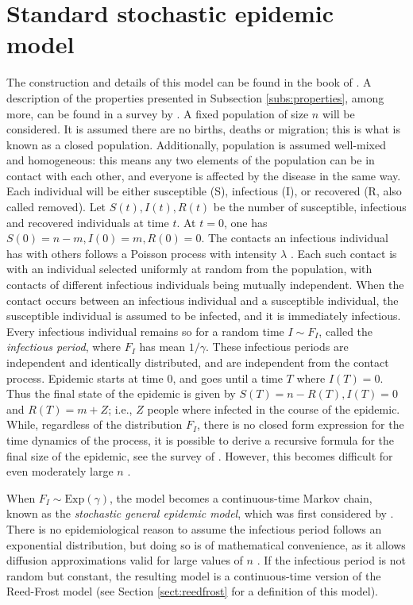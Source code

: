 \documentclass[aap]{imsart}
\theoremstyle{remark}
\begin{document}
\section{Standard stochastic epidemic model}\label{sect:standard_model}
The construction and details of this model can be found in the book of \citet{Andersson_Britton_2000}. A description of the properties presented in Subsection \ref{subs:properties}, among more, can be found in a survey by \citet{Britton_2010}. A fixed population of size $n$ will be considered. It is assumed there are no births, deaths or migration; this is what is known as a closed population. Additionally, population is assumed well-mixed and homogeneous: this means any two elements of the population can be in contact with each other, and everyone is affected by the disease in the same way. Each individual will be either susceptible (S), infectious (I), or recovered (R, also called removed). Let $S(t), I(t), R(t)$ be the number of susceptible, infectious and recovered individuals at time $t$. At $t = 0$, one has $S(0) = n - m, I(0) = m, R(0) = 0$. The contacts an infectious individual has with others follows a Poisson process with intensity $\lambda$ \citep{Andersson_Britton_2000, lawler_2006}. Each such contact is with an individual selected uniformly at random from the population, with contacts of different infectious individuals being mutually independent. When the contact occurs between an infectious individual and a susceptible individual, the susceptible individual is assumed to be infected, and it is immediately infectious. Every infectious individual remains so for a random time $I \sim F_I$, called the \textit{infectious period}, where $F_I$ has mean $1/\gamma$. These infectious periods are independent and identically distributed, and are independent from the contact process.  Epidemic starts at time 0, and goes until a time $T$ where $I(T) = 0$. Thus the final state of the epidemic is given by  $S(T) = n - R(T), I(T) = 0$ and $R(T) = m + Z$; i.e., $Z$ people where infected in the course of the epidemic. While, regardless of the distribution $F_I$, there is no closed form expression for the time dynamics of the process, it is possible to derive a recursive formula for the final size of the epidemic, see the survey of \citet{Britton_2010}. However, this becomes difficult for even moderately large $n$ \citep{Britton_2010}.

When $F_I \sim \mathrm{Exp}(\gamma)$, the model becomes a continuous-time Markov chain, known as the \textit{stochastic general epidemic model}, which was first considered by \citet{Bartlett_1949}. There is no epidemiological reason to assume the infectious period follows an exponential distribution, but doing so is of mathematical convenience, as it allows diffusion approximations valid for large values of $n$ \citep{Andersson_Britton_2000}. If the infectious period is not random but constant, the resulting model is a continuous-time version of the Reed-Frost model \citep{Andersson_Britton_2000} (see Section \ref{sect:reedfrost} for a definition of this model).
\end{document}
